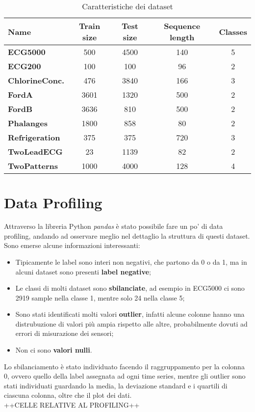 \begin{table}[H]
	\centering
	\begin{tabularx}{\textwidth}{X c c c c}
		\hline
		\textbf{Name} & \textbf{Train size} & \textbf{Test size} & \textbf{Sequence length} & \textbf{Classes} \\
		\hline
		\textbf{ECG5000} & 500 & 4500 & 140 & 5\\
		\textbf{ECG200} & 100 & 100 & 96 & 2\\
		\textbf{ChlorineConc.} & 476 & 3840 & 166 & 3\\
		\textbf{FordA} & 3601 & 1320 & 500 & 2\\
		\textbf{FordB} & 3636 & 810 & 500 & 2\\
		\textbf{Phalanges} & 1800 & 858 & 80 & 2\\
		\textbf{Refrigeration} & 375 & 375 & 720 & 3\\
		\textbf{TwoLeadECG} & 23 & 1139 & 82 & 2\\
		\textbf{TwoPatterns} & 1000 & 4000 & 128 & 4\\
	\end{tabularx}
	\caption{Caratteristiche dei dataset}
	\label{tab:datasets}
\end{table}

\section{Data Profiling}
Attraverso la libreria Python \textit{pandas} è stato possibile fare un po' di data profiling, andando ad osservare meglio nel dettaglio la struttura di questi dataset.\\
Sono emerse alcune informazioni interessanti:
\begin{itemize}
	\item Tipicamente le label sono interi non negativi, che partono da 0 o da 1, ma in alcuni dataset sono presenti \textbf{label negative};
	\item Le classi di molti dataset sono \textbf{sbilanciate}, ad esempio in ECG5000 ci sono 2919 sample nella classe 1, mentre solo 24 nella classe 5;
	\item Sono stati identificati molti valori \textbf{outlier}, infatti alcune colonne hanno una distrubuzione di valori più ampia rispetto alle altre, probabilmente dovuti ad errori di misurazione dei sensori;
	\item Non ci sono \textbf{valori nulli}.
\end{itemize}
Lo sbilanciamento è stato individuato facendo il raggruppamento per la colonna 0, ovvero quello della label assegnata ad ogni time series, mentre gli outlier sono stati individuati guardando la media, la deviazione standard e i quartili di ciascuna colonna, oltre che il plot dei dati.\\
++CELLE RELATIVE AL PROFILING++

